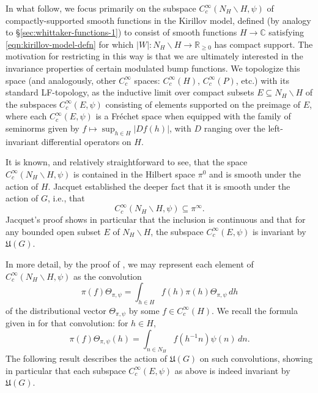 In what follow, we focus primarily on the subspace $C_c^\infty(N_H \backslash H,\psi)$ of compactly-supported smooth functions in the Kirillov model, defined (by analogy to \S\ref{sec:whittaker-functions-1}) to consist of smooth functions $H \rightarrow \mathbb{C}$ satisfying \eqref{eqn:kirillov-model-defn} for which $\lvert W \rvert : N_H \backslash H \rightarrow \mathbb{R}_{\geq 0}$ has compact support.  The motivation for restricting in this way is that we are ultimately interested in the invariance properties of certain modulated bump functions.  We topologize this space (and analogously, other $C_c^\infty$ spaces: $C_c^\infty(H)$, $C_c^\infty(P)$, etc.) with its standard LF-topology, as the inductive limit over compact subsets $E \subseteq N_H \backslash H$ of the subspaces $C_c^\infty(E, \psi)$ consisting of elements supported on the preimage of $E$, where each $C_c^\infty(E, \psi)$ is a Fréchet space when equipped with the family of seminorms given by $f \mapsto \sup_{h \in H} \lvert  D f(h)  \rvert$, with $D$ ranging over the left-invariant differential operators on $H$.

It is known, and relatively straightforward to see, that the space $C_c^\infty(N_H \backslash H, \psi)$ is contained in the Hilbert space $\pi^0$ and is smooth under the action of $H$.  Jacquet \cite[Prop 5]{MR2733072} established the deeper fact that it is smooth under the action of $G$, i.e., that
\begin{equation*}
  C_c^\infty(N_H \backslash H, \psi) \subseteq \pi^\infty.
\end{equation*}
Jacquet's proof shows in particular that the inclusion is continuous and that for any bounded open subset $E$ of $N_H \backslash H$, the subspace $C_c^\infty(E, \psi)$ is invariant by $\mathfrak{U}(G)$.

In more detail, by the proof of \cite[Prop 5]{MR2733072}, we may represent each element of $C_c^\infty(N_H \backslash H, \psi)$ as the convolution
\begin{equation*}
  \pi(f) \Theta_{\pi,\psi} = \int_{h \in H} f(h) \pi(h) \Theta_{\pi, \psi} \, d h
\end{equation*}
of the distributional vector $\Theta_{\pi, \psi}$ by some $f \in C_c^\infty(H)$.  We recall the formula given in \cite[Lem 7]{MR2733072} for that convolution: for $h \in H$,
\begin{equation}\label{eq:pif-theta_pi-h}
  \pi(f) \Theta_{\pi,\psi} (h)
  =
  \int_{n \in N_H}
  f(h^{-1} n)
  \psi(n) \, d n.
\end{equation}
The following result describes the action of $\mathfrak{U}(G)$ on such convolutions, showing in particular that each subspace $C_c^\infty(E, \psi)$ as above is indeed invariant by $\mathfrak{U}(G)$.

